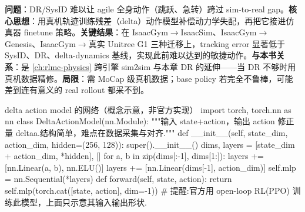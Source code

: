 \begin{paper}\label{paper:rlmc-dr-asap}
\textbf{问题}：DR/SysID 难以让 agile 全身动作（跳跃、急转）跨过 sim-to-real gap。\textbf{核心思想}：用真机轨迹训练残差（delta）动作模型补偿动力学失配，再把它接进仿真器 finetune 策略。\textbf{关键结果}：在 IsaacGym$\to$IsaacSim、IsaacGym$\to$Genesis、IsaacGym$\to$真实 Unitree G1 三种迁移上，tracking error 显著低于 SysID、DR、delta-dynamics 基线，实现此前难以达到的敏捷动作。\textbf{与本书关系}：是 \cref{ch:rlmc-physics} 跨引擎 sim2sim 与本章 DR 的延伸——当 DR 不够时用真机数据精修。\textbf{局限}：需 MoCap 级真机数据；base policy 若完全不鲁棒，可能差到连有意义的 real rollout 都采不到。
\end{paper}


\begin{codebox}[Python]{delta action model 的网络（概念示意，非官方实现）}
import torch, torch.nn as nn
class DeltaActionModel(nn.Module):
    """输入 state+action，输出 action 修正量 deltaa.结构简单，难点在数据采集与对齐."""
    def __init__(self, state_dim, action_dim, hidden=(256, 128)):
        super().__init__()
        dims, layers = [state_dim + action_dim, *hidden], []
        for a, b in zip(dims[:-1], dims[1:]):
            layers += [nn.Linear(a, b), nn.ELU()]
        layers += [nn.Linear(dims[-1], action_dim)]
        self.mlp = nn.Sequential(*layers)
    def forward(self, state, action):
        return self.mlp(torch.cat([state, action], dim=-1))
# 提醒:官方用 open-loop RL(PPO) 训练此模型，上面只示意其输入输出形状.
\end{codebox}

